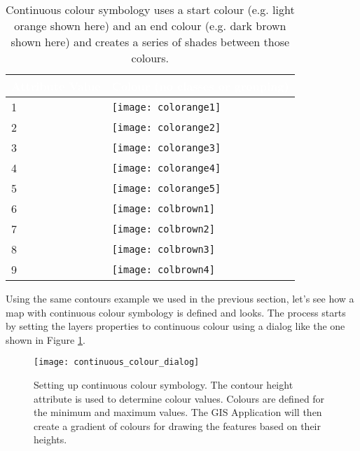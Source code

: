 \begin{table}[ht]
\centering
\caption{Continuous colour symbology uses a start colour (e.g. light orange
shown here) and an end colour (e.g. dark brown shown here) and creates a
series of shades between those colours.}\medskip
 \label{tab:contcolor}
 \begin{tabular}{|p{8cm}|p{8cm}|}
 \hline
 \rowcolor{black}
 \textcolor{white}{\textbf{Attribute Value}} &
 \textcolor{white}{\textbf{Colour (no classes or grouping)}} \\
 \hline 1 & \texttt{[image: colorange1]} \\
 \hline 2 & \texttt{[image: colorange2]} \\
 \hline 3 & \texttt{[image: colorange3]} \\
 \hline 4 & \texttt{[image: colorange4]} \\
 \hline 5 & \texttt{[image: colorange5]} \\
 \hline 6 & \texttt{[image: colbrown1]} \\
 \hline 7 & \texttt{[image: colbrown2]} \\
 \hline 8 & \texttt{[image: colbrown3]} \\
 \hline 9 & \texttt{[image: colbrown4]} \\
\hline
\end{tabular}
\end{table}

Using the same contours example we used in the previous section, let's see
how a map with continuous colour symbology is defined and looks. The process
starts by setting the layers properties to continuous colour using a dialog
like the one shown in Figure \ref{fig:contcoldialog}.

\begin{figure}[ht]
   \begin{center}
   \caption{Setting up continuous colour symbology. The contour height
attribute is used to determine colour values. Colours are defined for the
minimum and maximum values. The GIS Application will then create a gradient
of colours for drawing the features based on their heights.}
\label{fig:contcoldialog}\smallskip
   \texttt{[image: continuous\_colour\_dialog]}
\end{center}
\end{figure}

